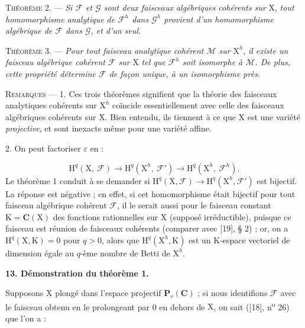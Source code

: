 \textsc{Théorème} 2. --- \textit{Si $\mathcal{F}$ et $\mathcal{G}$ sont deux faisceaux algébriques cohérents sur} $\mathrm{X}$, \textit{tout homomorphisme analytique de $\mathcal{F}^h$ dans $\mathcal{G}^h$ provient d'un homomorphisme algébrique de $\mathcal{F}$ dans $\mathcal{G}$, et d'un seul.}



\textsc{Théorème} 3. --- \textit{Pour tout faisceau analytique cohérent $\mathcal{M}$ sur} $\mathrm{X}^h$, \textit{il existe un faisceau algébrique cohérent $\mathcal{F}$ sur} $\mathrm{X}$ \textit{tel que $\mathcal{F}^h$ soit isomorphe à $\mathcal{M}$. De plus, cette propriété détermine $\mathcal{F}$ de façon unique, à un isomorphisme près.}

\textsc{Remarques} --- 1. Ces trois théorèmes signifient que la théorie des faisceaux analytiques cohérents sur $\mathrm{X}^h$ coïncide essentiellement avec celle des faisceaux algébriques cohérents sur $\mathrm{X}$. Bien entendu, ils tiennent à ce que $\mathrm{X}$ est une variété \textit{projective}, et sont inexacts même pour une variété affine.

2. On peut factoriser $\varepsilon$ en :

\begin{equation*}
\mathrm{H}^q(\mathrm{X},\ \mathcal{F}) \longrightarrow \mathrm{H}^q(\mathrm{X}^h,\ \mathcal{F}') \longrightarrow \mathrm{H}^q(\mathrm{X}^h,\ \mathcal{F}^h).
\end{equation*}
Le théorème 1 conduit à se demander si $\mathrm{H}^q(\mathrm{X}, \mathcal{F}) \longrightarrow \mathrm{H}^q(\mathrm{X}^h, \mathcal{F}')$ est bijectif. La réponse est négative ; en effet, si cet homomorphisme était bijectif pour tout faisceau algébrique cohérent $\mathcal{F}$, il le serait aussi pour le faisceau constant $\mathrm{K} = \mathbf{C}(\mathrm{X})$ des fonctions rationnelles sur $\mathrm{X}$ (supposé irréductible), puisque ce faisceau est réunion de faisceaux cohérents (comparer avec [19], § 2) ; or, on a $\mathrm{H}^q(\mathrm{X}, \mathrm{K}) = 0$ pour $q > 0$, alors que $\mathrm{H}^q(\mathrm{X}^h, \mathrm{K})$ est un $\mathrm{K}$-espace vectoriel de dimension égale au $q$-ème nombre de Betti de $\mathrm{X}^h$.


\textbf{13. Démonstration du théorème 1.}

Supposons $\mathrm{X}$ plongé dans l'espace projectif $\mathbf{P}_r(\mathbf{C})$ ; si nous identifions $\mathcal{F}$ avec le faisceau obtenu en le prolongeant par 0 en dehors de $\mathrm{X}$, on sait ([18], n\textsuperscript{o} 26) que l'on a :

